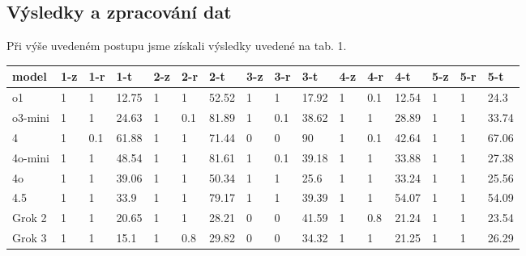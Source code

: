 \documentclass[czech,11pt,a4paper]{article}
\begin{document}
\begin{multicols}{2}
		\section{Výsledky a zpracování dat}
		Při výše uvedeném postupu jsme získali výsledky uvedené na tab. 1.
	\end{multicols}
		\begin{table}[H]
			\centering

				{\scriptsize \begin{tabular}{l|lll|lll|lll|lll|lll}
					\hline
					model &  1-z &  1-r &    1-t &  2-z &  2-r &    2-t &  3-z &  3-r &    3-t &  4-z &  4-r &    4-t &  5-z &  5-r &    5-t \\ \hline
					
					
					o1 &           1 &              1 &  12.75 &           1 &              1 &  52.52 &           1 &              1 &  17.92 &           1 &            0.1 &  12.54 &           1 &              1 &   24.3 \\
					o3-mini &           1 &              1 &  24.63 &           1 &            0.1 &  81.89 &           1 &            0.1 &  38.62 &           1 &              1 &  28.89 &           1 &              1 &  33.74 \\
					4 &           1 &            0.1 &  61.88 &           1 &              1 &  71.44 &           0 &              0 &     90 &           1 &            0.1 &  42.64 &           1 &              1 &  67.06 \\
					4o-mini &           1 &              1 &  48.54 &           1 &              1 &  81.61 &           1 &            0.1 &  39.18 &           1 &              1 &  33.88 &           1 &              1 &  27.38 \\
					4o  &           1 &              1 &  39.06 &           1 &              1 &  50.34 &           1 &              1 &   25.6 &           1 &              1 &  33.24 &           1 &              1 &  25.56 \\
					4.5 &           1 &              1 &   33.9 &           1 &              1 &  79.17 &           1 &              1 &  39.39 &           1 &              1 &  54.07 &           1 &              1 &  54.09 \\
					Grok 2 &           1 &              1 &  20.65 &           1 &              1 &  28.21 &           0 &              0 &  41.59 &           1 &            0.8 &  21.24 &           1 &              1 &  23.54 \\
					Grok 3 &           1 &              1 &   15.1 &           1 &            0.8 &  29.82 &           0 &              0 &  34.32 &           1 &              1 &  21.25 &           1 &              1 &  26.29 \\

\end{tabular}}
\end{table}
\end{document}
